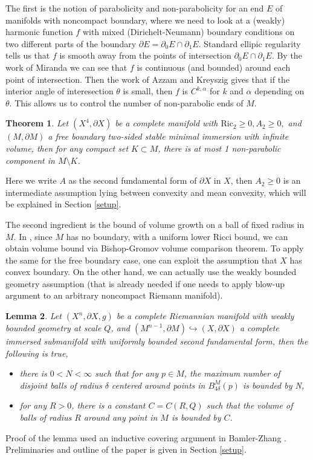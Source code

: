 \documentclass[12pt]{amsart}
\newcommand{\Ric}{\text{Ric}}
\newcommand{\p}{\partial}
\newtheorem{theorem}{Theorem}[section]
\newtheorem{lemma}[theorem]{Lemma}
\numberwithin{equation}{section}
\begin{document}
	The first is the notion of parabolicity and non-parabolicity for an end $E$ of manifolds with noncompact boundary, where we need to look at a (weakly) harmonic function $f$ with mixed (Dirichelt-Neumann) boundary conditions on two different parts of the boundary $\p E =\p_0 E \cap \p_1 E$. Standard ellipic regularity tells us that $f$ is smooth away from the points of intersection $\p _0 E \cap \p_1 E$.  By the work of Miranda \cite{Miran1955-SulProblemaMisto} we can see that $f$ is continuous (and bounded) around each point of intersection. Then the work of Azzam and Kreyszig \cite{AzzamKreys1982-SolutionsEllipticEquations} gives that if the interior angle of interesection $\theta$ is small, then $f$ is $C^{k,\alpha}$ for $k$ and $\alpha$ depending on $\theta$. This allows us to control the number of non-parabolic ends of $M$.
	\begin{theorem} 
		Let $(X^4,\partial X)$ be a complete manifold with $\Ric_2 \geq 0, A_2 \geq 0,$  and $(M,\partial M)$ a free boundary two-sided stable minimal immersion with infinite volume, then for any compact set $K \subset M$, there is at most 1 non-parabolic component in $M \setminus K$.
	\end{theorem}

	Here we write $A$ as the second fundamental form of $\p X$ in $X$, then $A_2 \geq 0$ is an intermediate assumption lying between convexity and mean convexity, which will be explained in Section \ref{setup}.

	The second ingredient is the bound of volume growth on a ball of fixed radius in $M$. In \cite{ChodoLiStryk2022-CompleteStableMinimal}, since $M$ has no boundary, with a uniform lower Ricci bound, we can obtain volume bound via Bishop-Gromov volume comparison theorem. 
	To apply the same for the free boundary case, one can exploit the assumption that $X$ has convex boundary. On the other hand, we can actually use the weakly bounded geometry assumption (that is already needed if one needs to apply blow-up argument to an arbitrary noncompact Riemann manifold).

	\begin{lemma}
        Let $(X^n,\partial X,g)$ be a complete Riemannian manifold with weakly bounded geometry at scale $Q$, and $(M^{n-1},\p M) \hookrightarrow (X,\p X)$ a complete immersed submanifold with uniformly bounded second fundamental form, then the following is true,
        \begin{itemize}
            \item there is $0<N<\infty$ such that for any $p\in M$, the maximum number of disjoint balls of radius $\delta$ centered around points in $B^M_{4\delta}(p)$ is bounded by N,
            \item for any $R>0$, there is a constant $C=C(R,Q)$ such that the volume of balls of radius $R$ around any point in $M$ is bounded by $C$.
        \end{itemize}
    \end{lemma}
	Proof of the lemma used an inductive covering argument in Bamler-Zhang \cite{BamleZhang2015-HeatKernelCurvature}. Preliminaries and outline of the paper is given in Section \ref{setup}.
\end{document}
